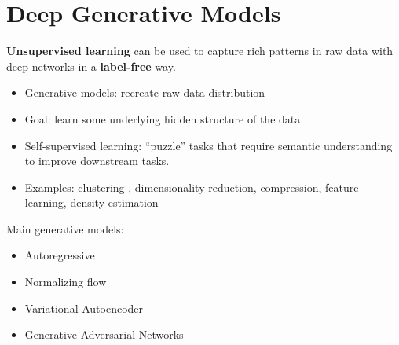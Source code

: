 ﻿


\newcommand{\D}{\mathcal{D}}
\newcommand{\KL}[2]{D_\mathrm{KL}\paren{#1 \mathbin{\|} #2}}
\renewcommand{\P}{\mathcal{P}}
\newcommand{\X}{\mathcal{X}}
\newcommand{\Z}{\mathcal{Z}}
\newcommand{\Q}{\mathcal{Q}}
\newcommand{\ba}{\mathbf{a}}
\newcommand{\bb}{\mathbf{b}}
\newcommand{\bc}{\mathbf{c}}
\newcommand{\be}{\mathbf{e}}
\newcommand{\bh}{\mathbf{h}}
\newcommand{\bv}{\mathbf{v}}
\newcommand{\bx}{\mathbf{x}}
\newcommand{\bz}{\mathbf{z}}
\newcommand{\M}{\mathcal{B}}
\newcommand{\ELBO}{\mathrm{ELBO}}
\newcommand{\giv}{\mid}
\newcommand{\paren}[1]{\left(#1\right)}
\newcommand{\brac}[1]{\left[#1\right]}
\newcommand{\veps}{\varepsilon}
\newcommand{\set}[1]{\left\{#1\right\}}
\renewcommand{\d}{\mathop{}\!\mathrm{d}}
\newcommand{\Expect}{\mathbb{E}}
\newcommand{\Normal}{\mathcal{N}}
\newcommand{\I}{\mathbf{I}}
\newcommand{\0}{\mathbf{0}}


\chapter{Deep Generative Models}
\setcounter{section}{-1}


{\bf Unsupervised learning} can be used to capture rich patterns in raw data with deep 
networks in a {\bf label-free} way.

\begin{itemize}
\setlength{\parskip}{0pt}
\item
Generative models: recreate raw data distribution

\item
Goal: learn some underlying hidden structure of the data

\item
Self-supervised learning: “puzzle” tasks that require semantic understanding to improve 
downstream tasks.

\item
Examples: clustering , dimensionality reduction, compression, feature learning, density 
estimation
\end{itemize}

Main generative models:

\begin{itemize}
\setlength{\parskip}{0pt}
\item
Autoregressive
\item
Normalizing flow
\item
Variational Autoencoder
\item
Generative Adversarial Networks
\end{itemize}

